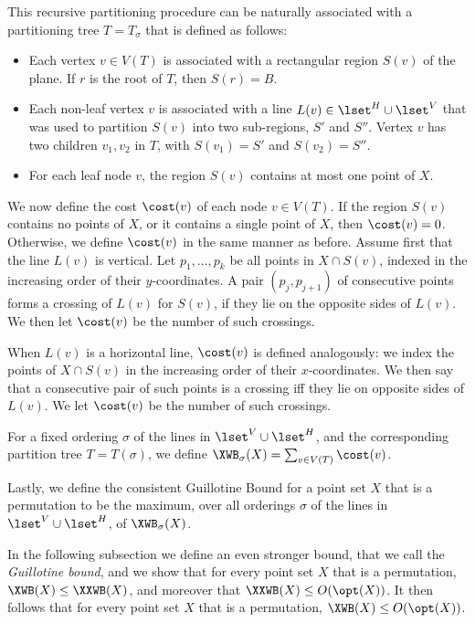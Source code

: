 \documentclass[11pt]{article}
\numberwithin{equation}{section}
\theoremstyle{definition}
\theoremstyle{plain}
\begin{document}
%
%

This recursive partitioning procedure can be naturally associated with a partitioning tree  $T=T_{\sigma}$ that is defined as follows: 

\begin{itemize}
\item Each vertex $v\in V(T)$ is associated with a rectangular region $S(v)$ of the plane. If $r$ is the root of $T$, then $S(r) =B$. 

\item Each non-leaf vertex $v$  is associated with a line $L(v)\in \lset^H\cup \lset^V$ that was used to partition $S(v)$ into two sub-regions, $S'$ and $S''$. Vertex $v$ has two children $v_1,v_2$ in $T$, with $S(v_1)=S'$ and $S(v_2)=S''$.

\item For each leaf node $v$, the region $S(v)$ contains at most one point of $X$.
\end{itemize}  




We now define the cost $\cost(v)$ of each node $v\in V(T)$. If the region $S(v)$ contains no points of $X$, or it contains a single point of $X$, then $\cost(v)=0$. Otherwise, we define $\cost(v)$ in the same manner as before. Assume first that the line $L(v)$ is vertical. Let $p_1, \ldots, p_k$  be all points in $X\cap S(v)$, indexed in the increasing order of their $y$-coordinates. A pair $(p_j, p_{j+1})$ of consecutive  points forms a crossing of $L(v)$ for $S(v)$, if they lie on the opposite sides of $L(v)$. We then let $\cost(v)$ be the number of such crossings. 

When $L(v)$ is a horizontal line, $\cost(v)$ is defined analogously: we index the points of $X\cap S(v)$ in the increasing order of their $x$-coordinates. We then say that a consecutive pair of such points is a crossing iff they lie on opposite sides of $L(v)$. We let $\cost(v)$ be the number of such crossings.

For a fixed ordering $\sigma$ of the lines in $\lset^V\cup \lset^H$, and the corresponding partition tree $T= T(\sigma)$, we define $\XWB_{\sigma}(X) = \sum_{v \in V(T)} \cost(v)$. 

Lastly, we define the consistent Guillotine Bound for a point set $X$ that is a permutation to be the maximum, over all orderings $\sigma$ of the lines in $\lset^V\cup \lset^H$, of $\XWB_{\sigma}(X)$.  


In the following subsection we define an even stronger bound, that we call the \emph{Guillotine bound}, and we show that for every point set $X$ that is a permutation, $\XWB(X)\leq \XXWB(X)$, and moreover that $\XXWB(X)\leq O(\opt(X))$. It then follows that for every point set $X$ that is a permutation, $\XWB(X)\leq O(\opt(X))$.
\end{document}
